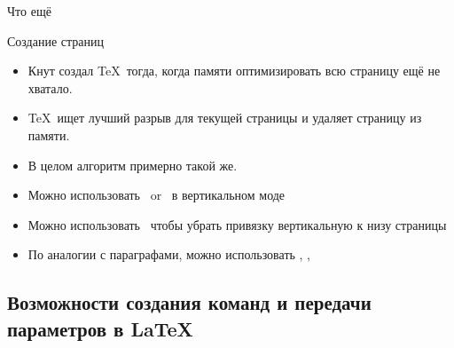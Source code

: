 {\begin{frame}{Что ещё }
\end{frame}

\begin{frame}{Создание страниц}\relax
    \begin{itemize}
        \item Кнут создал \TeX\ тогда, когда памяти оптимизировать всю страницу ещё не хватало.
        \item \TeX\ ищет лучший разрыв для текущей страницы и удаляет страницу из памяти.
        \item В целом алгоритм примерно такой же.
        \item Можно использовать \ccol\penalty\ or \ccol\nobreak\ в вертикальном моде
        \item Можно использовать \raggedbottom\ чтобы убрать привязку вертикальную к низу страницы
        \item По аналогии с параграфами, можно использовать \ccol\newpage, \ccol\pagebreak, \ccol\nopagebreak
         
    \end{itemize}
     
\end{frame}
}
\subsection{Возможности создания команд и передачи параметров в \LaTeX}

